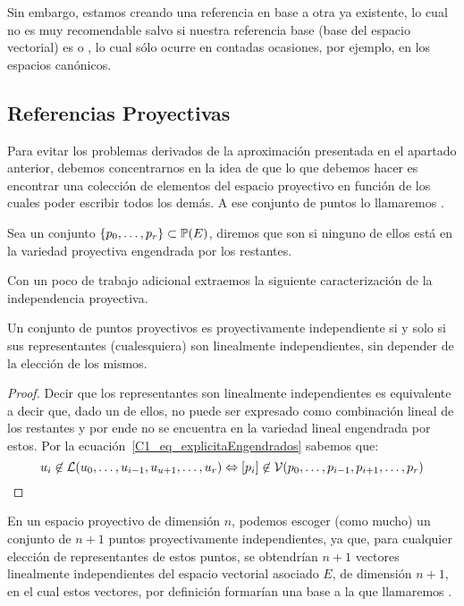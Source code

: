 Sin embargo, estamos creando una referencia en base a otra ya existente, lo cual no es muy recomendable salvo si nuestra referencia base (base del espacio vectorial) es  o , lo cual sólo ocurre en contadas ocasiones, por ejemplo, en los espacios canónicos.
\subsection{Referencias Proyectivas}
Para evitar los problemas derivados de la aproximación presentada en el apartado anterior, debemos concentrarnos en la idea de que lo que debemos hacer es encontrar una colección de elementos del espacio proyectivo en función de los cuales poder escribir todos los demás. A ese conjunto de puntos lo llamaremos .
\begin{defi}
	\label{C1_def_independenciaProyectiva}
	Sea un conjunto $\{p_0,\dots,p_r\}\subset\mathbb{P}(E)$, diremos que son  si ninguno de ellos está en la variedad proyectiva engendrada por los restantes.
\end{defi}
Con un poco de trabajo adicional extraemos la siguiente caracterización de la independencia proyectiva.
\begin{lem}
	\label{C1_lem_caracterizacionIndependencia}
	Un conjunto de puntos proyectivos es proyectivamente independiente si y solo si sus representantes (cualesquiera) son linealmente independientes, sin depender de la elección de los mismos. 
\end{lem}
\begin{proof}
	Decir que los representantes son linealmente independientes es equivalente a decir que, dado un de ellos, no puede ser expresado como combinación lineal de los restantes y por ende no se encuentra en la variedad lineal engendrada por estos. Por la ecuación~\eqref{C1_eq_explicitaEngendrados} sabemos que:
	\[u_i\not\in\mathcal{L}(u_0,\dots,u_{i-1},u_{u+1},\dots,u_{r})\Leftrightarrow\left [ p_i \right ]\not\in\mathcal{V}(p_0,\dots,p_{i-1},p_{i+1},\dots,p_r)\]
\end{proof}
\begin{obs}
	\label{C1_obs_baseInducida}
	En un espacio proyectivo de dimensión $n$, podemos escoger (como mucho) un conjunto de $n+1$ puntos proyectivamente independientes, ya que, para cualquier elección de representantes de estos puntos, se obtendrían $n+1$ vectores linealmente independientes del espacio vectorial asociado $E$, de dimensión $n+1$, en el cual estos vectores, por definición formarían una base a la que llamaremos .
\end{obs}
